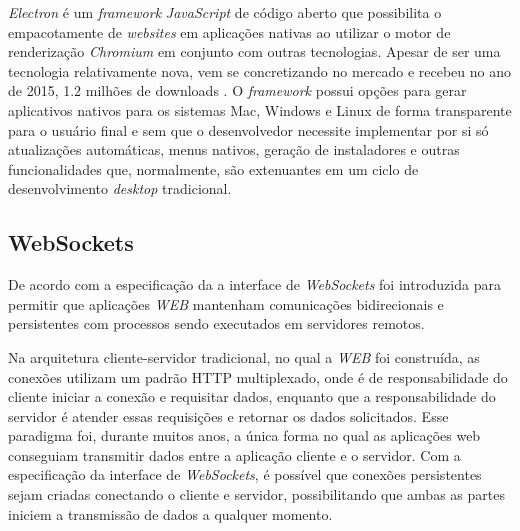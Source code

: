 \textit{Electron} é um \textit{framework} \textit{JavaScript} de código aberto que possibilita o empacotamente de \textit{websites} em aplicações nativas ao utilizar o motor de renderização \textit{Chromium} em conjunto com outras tecnologias. Apesar de ser uma tecnologia relativamente nova, vem se concretizando no mercado e recebeu no ano de 2015, 1.2 milhões de downloads \cite{electron}. O \textit{framework} possui opções para gerar aplicativos nativos para os sistemas Mac, Windows e Linux de forma transparente para o usuário final e sem que o desenvolvedor necessite implementar por si só atualizações automáticas, menus nativos, geração de instaladores e outras funcionalidades que, normalmente, são extenuantes em um ciclo de desenvolvimento \textit{desktop} tradicional. \cite{electron}

\subsection{\esp WebSockets}

De acordo com a especificação da \cite{htmlStandard} a interface de \textit{WebSockets} foi introduzida para permitir que aplicações \textit{WEB} mantenham comunicações bidirecionais e persistentes com processos sendo executados em servidores remotos.

Na arquitetura cliente-servidor tradicional, no qual a \textit{WEB} foi construída, as conexões utilizam um padrão HTTP multiplexado, onde é de responsabilidade do cliente iniciar a conexão e requisitar dados, enquanto que a responsabilidade do servidor é atender essas requisições e retornar os dados solicitados. Esse paradigma foi, durante muitos anos, a única forma no qual as aplicações web conseguiam transmitir dados entre a aplicação cliente e o servidor. Com a especificação da interface de \textit{WebSockets}, é possível que conexões persistentes sejam criadas conectando o cliente e servidor, possibilitando que ambas as partes iniciem a transmissão de dados a qualquer momento.


